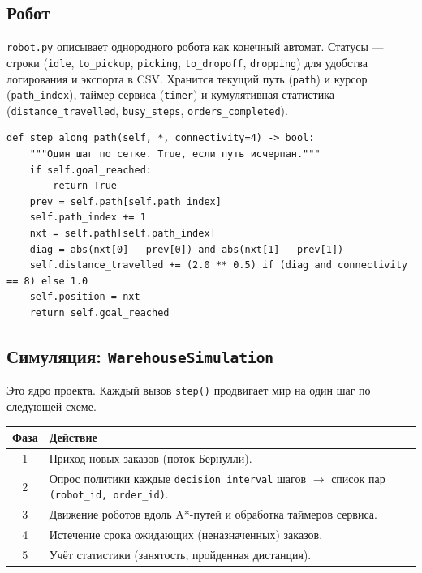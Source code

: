 \documentclass[11pt,a4paper]{article}
\newcommand{\code}[1]{\texttt{#1}}
\begin{document}
\subsection{Робот}
\code{robot.py} описывает однородного робота как конечный автомат. Статусы —
строки (\code{idle}, \code{to\_pickup}, \code{picking}, \code{to\_dropoff},
\code{dropping}) для удобства логирования и экспорта в CSV. Хранится текущий
путь (\code{path}) и курсор (\code{path\_index}), таймер сервиса (\code{timer}) и
кумулятивная статистика (\code{distance\_travelled}, \code{busy\_steps},
\code{orders\_completed}).

\begin{lstlisting}[style=py]
def step_along_path(self, *, connectivity=4) -> bool:
    """Один шаг по сетке. True, если путь исчерпан."""
    if self.goal_reached:
        return True
    prev = self.path[self.path_index]
    self.path_index += 1
    nxt = self.path[self.path_index]
    diag = abs(nxt[0] - prev[0]) and abs(nxt[1] - prev[1])
    self.distance_travelled += (2.0 ** 0.5) if (diag and connectivity == 8) else 1.0
    self.position = nxt
    return self.goal_reached
\end{lstlisting}

\subsection{Симуляция: \code{WarehouseSimulation}}
Это ядро проекта. Каждый вызов \code{step()} продвигает мир на один шаг по
следующей схеме.

\begin{center}
\begin{tabular}{@{}cl@{}}
\toprule
\textbf{Фаза} & \textbf{Действие} \\
\midrule
1 & Приход новых заказов (поток Бернулли). \\
2 & Опрос политики каждые \code{decision\_interval} шагов $\rightarrow$
список пар \code{(robot\_id, order\_id)}. \\
3 & Движение роботов вдоль A*-путей и обработка таймеров сервиса. \\
4 & Истечение срока ожидающих (неназначенных) заказов. \\
5 & Учёт статистики (занятость, пройденная дистанция). \\
\bottomrule
\end{tabular}
\end{center}
\end{document}
